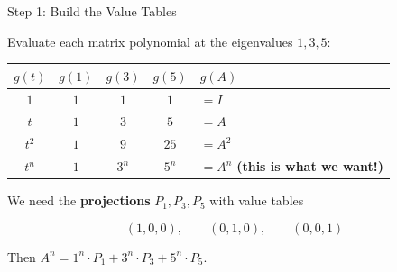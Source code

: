 \documentclass[10pt]{beamer}
\theoremstyle{definition}
\newcommand{\x}[1]{\alert{\textbf{#1}}}
\begin{document}
%
\begin{frame}{Step 1: Build the Value Tables}

Evaluate each matrix polynomial at the eigenvalues $1, 3, 5$:

\vfill

\begin{center}
\renewcommand{\arraystretch}{1.5}
\begin{tabular}{c|ccc|l}
$g(t)$ & $g(1)$ & $g(3)$ & $g(5)$ & $g(A)$ \\
\hline
$1$ & $1$ & $1$ & $1$ & $= I$ \\
$t$ & $1$ & $3$ & $5$ & $= A$ \\
$t^2$ & $1$ & $9$ & $25$ & $= A^2$ \\
\hline
$t^n$ & $1$ & $3^n$ & $5^n$ & $= A^n$ \;\x{(this is what we want!)}
\end{tabular}
\end{center}

\vfill\pause

We need the \x{projections} $P_1, P_3, P_5$ with value tables

$$(1,0,0), \qquad (0,1,0), \qquad (0,0,1)$$

\vfill

Then $A^n = 1^n \cdot P_1 + 3^n \cdot P_3 + 5^n \cdot P_5$.

\end{frame}
\end{document}
